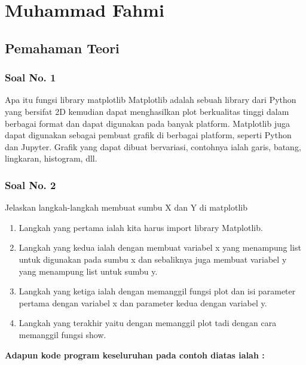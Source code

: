 \section{Muhammad Fahmi}
\subsection{Pemahaman Teori}
\subsubsection{Soal No. 1}
\hfill \break
Apa itu fungsi library matplotlib
\hfill \break
Matplotlib adalah sebuah library dari Python yang bersifat 2D kemudian dapat menghasilkan plot berkualitas tinggi dalam berbagai format dan dapat digunakan pada banyak platform.
Matplotlib juga dapat digunakan sebagai pembuat grafik di berbagai platform, seperti Python dan Jupyter. Grafik yang dapat dibuat bervariasi, contohnya ialah garis, batang, lingkaran, histogram, dll.

\subsubsection{Soal No. 2}
\hfill \break
Jelaskan langkah-langkah membuat sumbu X dan Y di matplotlib

\begin{enumerate}
	\item Langkah yang pertama ialah kita harus import library Matplotlib.	
	
	
	\item Langkah yang kedua ialah dengan membuat variabel x yang menampung list untuk digunakan pada sumbu x dan sebaliknya juga membuat variabel y yang menampung list untuk sumbu y.	
	
	
	\item Langkah yang ketiga ialah dengan memanggil fungsi plot dan isi parameter pertama dengan variabel x dan parameter kedua dengan variabel y.
		

	\item Langkah yang terakhir yaitu dengan memanggil plot tadi dengan cara memanggil fungsi show.
	
	
\end{enumerate}
\hfill \break
\textbf{Adapun kode program keseluruhan pada contoh diatas ialah :}

